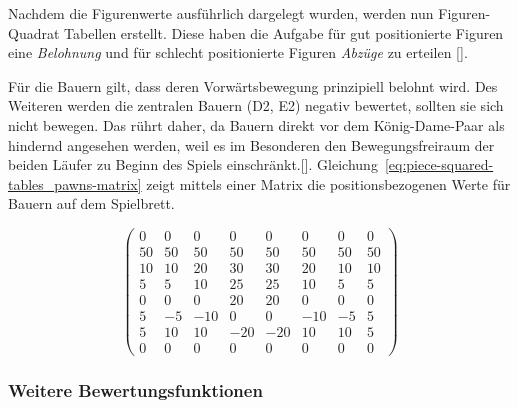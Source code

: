 Nachdem die Figurenwerte ausführlich dargelegt wurden, werden nun Figuren-Quadrat Tabellen erstellt.
Diese haben die Aufgabe für gut positionierte Figuren eine \textit{Belohnung} und für schlecht positionierte Figuren \textit{Abzüge} zu erteilen [\cite{Wiki2018}].

Für die Bauern gilt, dass deren Vorwärtsbewegung prinzipiell belohnt wird.
Des Weiteren werden die zentralen Bauern (D2, E2) negativ bewertet, sollten sie sich nicht bewegen.
Das rührt daher, da Bauern direkt vor dem König-Dame-Paar als hindernd angesehen werden, weil es im Besonderen den Bewegungsfreiraum der beiden Läufer zu Beginn des Spiels einschränkt.[\cite{Wiki2018}].
Gleichung~\ref{eq:piece-squared-tables_pawns-matrix} zeigt mittels einer Matrix die positionsbezogenen Werte für Bauern auf dem Spielbrett.

\begin{equation} \label{eq:piece-squared-tables_pawns-matrix}
\begin{pmatrix}
0 & 0 & 0 & 0 & 0 & 0 & 0 & 0 \\
50 & 50 & 50 & 50 & 50 & 50 & 50 & 50 \\
10 & 10 & 20 & 30 & 30 & 20 & 10 & 10 \\
5 & 5 & 10 & 25 & 25 & 10 & 5 & 5 \\
0 & 0 & 0 & 20 & 20 & 0 & 0 & 0 \\
5 & -5 & -10 & 0 & 0 & -10 & -5 & 5 \\
5 & 10 & 10 & -20 & -20 & 10 & 10 & 5 \\
0 & 0 & 0 & 0 & 0 & 0 & 0 & 0
\end{pmatrix}
\end{equation}


\subsubsection{Weitere Bewertungsfunktionen}


